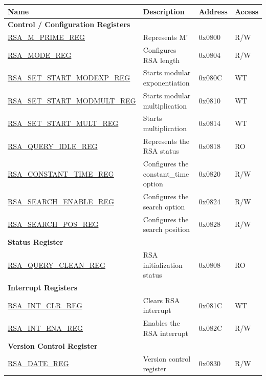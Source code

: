 \begin{longtable}{ | l | l | l | l | }
\hline\rowcolor{lightgray}
\textbf{Name} & \textbf{Description} &  \textbf{Address} & \textbf{Access} \\ \hline
\endhead
\multicolumn{4}{|l|}{\textbf{Control / Configuration Registers}} \\ \hline
\hyperref[regdesc:RSAMPRIMEREG]{RSA\_M\_PRIME\_REG} & Represents M’ & 0x0800 & R/W \\ \hline
\hyperref[regdesc:RSAMODEREG]{RSA\_MODE\_REG} & Configures RSA length & 0x0804 & R/W \\ \hline
\hyperref[regdesc:RSASETSTARTMODEXPREG]{RSA\_SET\_START\_MODEXP\_REG} & Starts modular exponentiation & 0x080C & WT \\ \hline
\hyperref[regdesc:RSASETSTARTMODMULTREG]{RSA\_SET\_START\_MODMULT\_REG} & Starts modular multiplication & 0x0810 & WT \\ \hline
\hyperref[regdesc:RSASETSTARTMULTREG]{RSA\_SET\_START\_MULT\_REG} & Starts multiplication & 0x0814 & WT \\ \hline
\hyperref[regdesc:RSAQUERYIDLEREG]{RSA\_QUERY\_IDLE\_REG} & Represents the RSA status & 0x0818 & RO \\ \hline
\hyperref[regdesc:RSACONSTANTTIMEREG]{RSA\_CONSTANT\_TIME\_REG} & Configures the constant\_time option & 0x0820 & R/W \\ \hline
\hyperref[regdesc:RSASEARCHENABLEREG]{RSA\_SEARCH\_ENABLE\_REG} & Configures the search option & 0x0824 & R/W \\ \hline
\hyperref[regdesc:RSASEARCHPOSREG]{RSA\_SEARCH\_POS\_REG} & Configures the search position & 0x0828 & R/W \\ \hline
\multicolumn{4}{|l|}{\textbf{Status Register}} \\ \hline
\hyperref[regdesc:RSAQUERYCLEANREG]{RSA\_QUERY\_CLEAN\_REG} & RSA initialization status & 0x0808 & RO \\ \hline
\multicolumn{4}{|l|}{\textbf{Interrupt Registers}} \\ \hline
\hyperref[regdesc:RSAINTCLRREG]{RSA\_INT\_CLR\_REG} & Clears RSA interrupt & 0x081C & WT \\ \hline
\hyperref[regdesc:RSAINTENAREG]{RSA\_INT\_ENA\_REG} & Enables the RSA interrupt & 0x082C & R/W \\ \hline
\multicolumn{4}{|l|}{\textbf{Version Control Register}} \\ \hline
\hyperref[regdesc:RSADATEREG]{RSA\_DATE\_REG} & Version control register & 0x0830 & R/W \\ \hline
\end{longtable}
